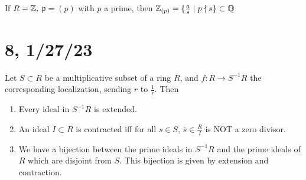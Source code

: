 \documentclass[x11names,reqno,14pt]{extarticle}
\newcommand{\mk}[1]{\mathfrak{#1}}
\begin{document}
\exm

If $R = \mathbb{Z},$ $\mk{p} = (p)$ with $p$ a prime, then $\mathbb{Z}_{(p)} = \{\frac{a}{s}\mid p\nmid s\}\subset\mathbb{Q}$ 

\section*{8, 1/27/23}

\prop

Let $S \subset R$ be a multiplicative subset of a ring $R$, and $f:R\to S^{-1}R$ the corresponding localization, sending $r$ to $\frac{1}{r}$. Then
\begin{enumerate}[label=(\roman*)]

\item Every ideal in $S^{-1}R$ is extended. 

\item An ideal $I \subset R$ is contracted iff for all $s \in S$, $\bar{s}\in \frac{R}{I}$ is NOT a zero divisor. 

\item We have a bijection between the prime ideals in $S^{-1}R$ and the prime ideals of $R$ which are disjoint from $S$. This bijection is given by extension and contraction. 

\end{enumerate}


\proof
\end{document}
